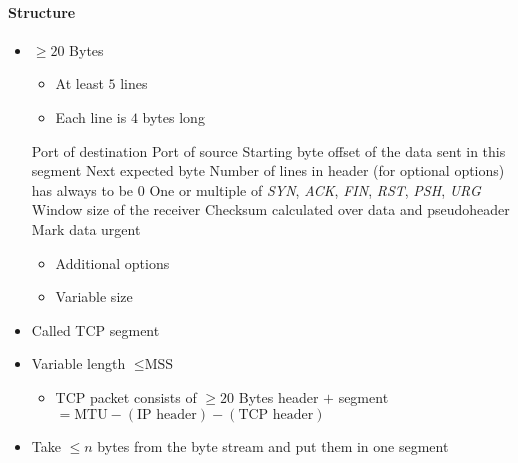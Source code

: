 \paragraph{Structure}
\begin{itemize}
        \begin{itemize}
            \item $\ge 20$ Bytes
                \begin{itemize}
                    \item At least $5$ lines
                    \item Each line is $4$ bytes long
                \end{itemize}
             Port of destination
             Port of source
             Starting byte offset of the data sent in this segment
             Next expected byte
             Number of lines in header (for optional options)
             has always to be $0$
             One or multiple of \textit{SYN}, \textit{ACK}, \textit{FIN}, \textit{RST}, \textit{PSH}, \textit{URG}
             Window size of the receiver
             Checksum calculated over data and pseudoheader
             Mark data urgent
                \begin{itemize}
                    \item Additional options
                    \item Variable size
                \end{itemize}
        \end{itemize}
        \begin{itemize}
            \item Called TCP segment
            \item Variable length $\le \text{MSS}$
                \begin{itemize}
                     Maximal size of a IP packet
                    \item TCP packet consists of $\ge 20$ Bytes header $+$ segment
                         $= \text{MTU} - (\text{IP header}) - (\text{TCP header})$
                \end{itemize}
            \item Take $\le n$ bytes from the byte stream and put them in one segment

\end{itemize}
\end{itemize}

